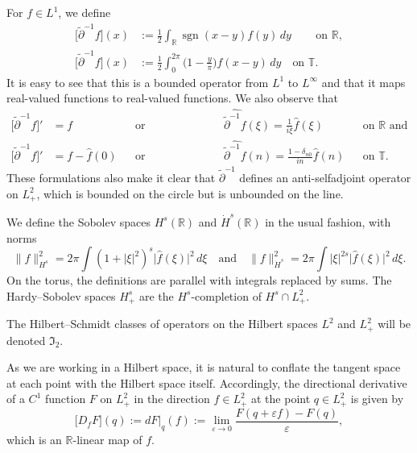 \documentclass{amsart}
\numberwithin{equation}{section}
\theoremstyle{definition}
\newcommand{\eps}{\varepsilon}
\newcommand{\R}{\mathbb{R}}
\newcommand{\T}{\mathbb{T}}
\newcommand{\I}{\mathfrak{I}}
\newcommand{\f}{\frac}
\newcommand{\dd}{\partial}
\DeclareMathOperator{\sgn}{sgn}
\newcommand{\qtq}[1]{\quad\text{#1}\quad}
\begin{document}
For $f\in L^1$, we define
\begin{equation}\label{delta inverse}
\begin{aligned}
\bigl[\tilde{\dd}^{-1}f\bigr](x)&:=\tfrac12\int_\R \sgn(x-y) f(y)\, dy  \qquad\, \text{on $\R$},\\
\bigl[\tilde{\dd}^{-1}f\bigr](x)&:=\tfrac12\int_0^{2\pi} \bigl(1-\tfrac{y}{\pi}) f(x-y)\, dy  \quad \text{on $\T$}.
\end{aligned}
\end{equation}
It is easy to see that this is a bounded operator from $L^1$ to $L^\infty$ and that it maps real-valued functions to real-valued functions.  We also observe that
\begin{equation}\label{delta inverse'}
\begin{aligned}
\bigl[\tilde{\dd}^{-1}f\bigr]'&=f  &&\text{or equivalently}  &&\widehat{\widetilde\partial^{-1}f} (\xi) = \tfrac{1}{i\xi} \widehat f (\xi)
	&&\text{on $\R$ and} \\
\bigl[\tilde{\dd}^{-1}f\bigr]'&=f- \widehat f(0) &&\text{or equivalently}  &&\widehat{\widetilde\partial^{-1}f} (n) = \tfrac{1-\delta_{n0}}{in} \widehat f (n)
	&&\text{on $\T$}.
\end{aligned}
\end{equation}
These formulations also make it clear that $\tilde{\dd}^{-1}$ defines an anti-selfadjoint operator on $L^2_+$, which is bounded on the circle but is unbounded on the line.

We define the Sobolev spaces $H^s(\R)$ and $\dot H^s(\R)$ in the usual fashion, with norms 
$$
\|f\|_{H^s}^2 = 2\pi\int (1 +|\xi|^2)^s \bigl|\widehat f(\xi)\bigr|^2\,d\xi \qtq{and}
\|f\|_{\dot H^s}^2 = 2\pi \int |\xi|^{2s} \bigl|\widehat f(\xi)\bigr|^2\,d\xi . 
$$ 
On the torus, the definitions are parallel with integrals replaced by sums.  The Hardy--Sobolev spaces $H^s_+$ are the $H^s$-completion of $H^s\cap L^2_+$.

The Hilbert--Schmidt classes of operators on the Hilbert spaces $L^2$ and $L^2_+$ will be denoted $\I_2$.

As we are working in a Hilbert space, it is natural to conflate the tangent space at each point with the Hilbert space itself.  Accordingly, the directional derivative of a $C^1$ function $F$ on $L^2_+$ in the direction $f\in L^2_+$ at the point $q\in L^2_+$ is given by
$$
\bigl[D_f F \bigr](q) := dF|_q(f):= \lim_{\eps\to0}\f{F(q+\eps f)-F(q)}{\eps},
$$
which is an $\R$-linear map of $f$.
\end{document}
